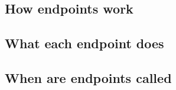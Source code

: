 \documentclass[../main.tex]{subfiles}
\begin{document}
\subsection*{How endpoints work}


\subsection*{What each endpoint does}


\subsection*{When are endpoints called}

\end{document}
